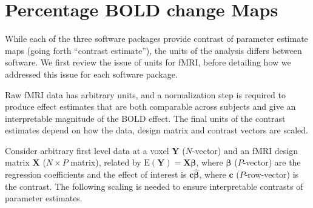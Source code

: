 %



%

\section{Percentage BOLD change Maps}
\label{App:SC_supplementary_BOLD}

While each of the three software packages provide contrast of parameter estimate maps (going forth ``contrast estimate''), the units of the analysis differs between software.  We first review the issue of units for fMRI, before detailing how we addressed this issue for each software package.

Raw fMRI data has arbitrary units, and a normalization step is required to produce effect estimates that are both comparable across subjects and give an interpretable magnitude of the BOLD effect. The final units of the contrast estimates depend on how the data, design matrix and contrast vectors are scaled.

Consider arbitrary first level data at a voxel $\bm{Y}$ ($N$-vector) and an fMRI design matrix $\bm{X}$ ($N\times P$ matrix), related by $\mathrm{E}(\bm{Y})=\bm{X}\bm{\beta}$, where $\bm{\beta}$ ($P$-vector) are the regression coefficients and the effect of interest is $\bm{c}\hat{\bm{\beta}}$, where $\bm{c}$ ($P$-row-vector) is the contrast.  The following scaling is needed to ensure interpretable contrasts of parameter estimates.

